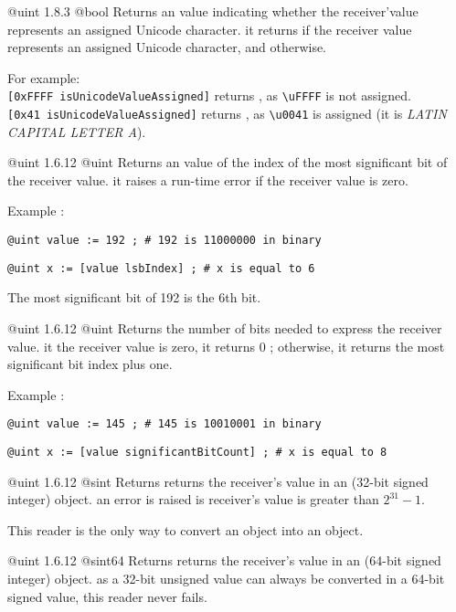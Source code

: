 {@uint}
{1.8.3}
{@bool}
{Returns an  value indicating whether the receiver'value represents an assigned Unicode character.}
{it returns  if the receiver value represents an assigned Unicode character,  and otherwise.}

For example:\\
\texttt{[0xFFFF isUnicodeValueAssigned]} returns , as \texttt{\textbackslash uFFFF} is not assigned.\\
\texttt{[0x41 isUnicodeValueAssigned]} returns , as \texttt{\textbackslash u0041} is assigned (it is \emph{LATIN CAPITAL LETTER A}).



{@uint}
{1.6.12}
{@uint}
{Returns an  value of the index of the most significant bit of the receiver value.}
{it raises a run-time error if the receiver value is zero.}

Example :

\texttt{@uint value := 192 ; \# 192 is 11000000 in binary}

\texttt{@uint x := [value lsbIndex] ; \# x is equal to 6}

The most significant bit of 192 is the 6th bit.




{@uint}
{1.6.12}
{@uint}
{Returns the number of bits needed to express the receiver value.}
{it the receiver value is zero, it returns 0 ; otherwise, it returns the most significant bit index plus one.}

Example :

\texttt{@uint value := 145 ; \# 145 is 10010001 in binary}

\texttt{@uint x := [value significantBitCount] ; \# x is equal to 8}





{@uint}
{1.6.12}
{@sint}
{Returns returns the receiver's value in an  (32-bit signed integer) object.}
{an error is raised is receiver's value is greater than $2^{31}-1$.}

This reader is the only way to convert an  object into an  object.




{@uint}
{1.6.12}
{@sint64}
{Returns returns the receiver's value in an  (64-bit signed integer) object.}
{as a 32-bit unsigned value can always be converted in a 64-bit signed value, this reader never fails.}

